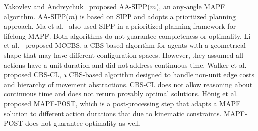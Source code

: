 \documentclass[review]{elsarticle}
\newcommand{\ccbs}{\ac{CCBS}\xspace}
\newcommand{\cbs}{\ac{CBS}\xspace}
\newcommand{\sipp}{\ac{SIPP}\xspace}
\newcommand{\mapfr}{\ac{MAPF}$_R$\xspace}
\newcommand{\mapf}{\ac{MAPF}\xspace}
\newcommand{\shortcite}{\cite}
\begin{document}
Yakovlev and Andreychuk~\shortcite{yakovlev2017anyAngle} proposed AA-SIPP($m$), an any-angle \ac{MAPF} algorithm. 
AA-SIPP($m$) is based on \sipp and adopts a prioritized planning approach. Ma et al.~\shortcite{ma2019lifelong} also used \sipp in a prioritized planning framework for lifelong \mapf. Both algorithms do not guarantee completeness or optimality. 
Li et al.~\shortcite{li2019multi} proposed \ac{MCCBS}, a \cbs-based algorithm for agents with a geometrical shape that may have different configuration spaces. However, they assumed all actions have a unit duration and did not address continuous time. %
Walker et al.~\shortcite{walker2017using} proposed \cbs-CL, a \cbs-based algorithm designed to handle non-unit edge costs and hierarchy of movement abstractions. \cbs-CL does not allow reasoning about continuous time and does not return provably optimal solutions. H{\"o}nig et al.~\shortcite{honig2017summary} proposed MAPF-POST, which is a post-processing step that adapts a \ac{MAPF} solution to different action durations that due to kinematic constraints. MAPF-POST does not guarantee optimality as well. 
\end{document}
